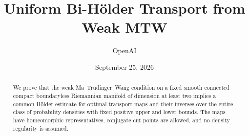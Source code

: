\documentclass[11pt]{article}
\title{Uniform Bi-H\"older Transport from Weak MTW}
\author{OpenAI}
\date{September 25, 2026}
\numberwithin{equation}{section}
\theoremstyle{definition}
\theoremstyle{remark}
\begin{document}
\maketitle
\begin{abstract}
We prove that the weak Ma--Trudinger--Wang condition on a fixed smooth
connected compact boundaryless Riemannian manifold of dimension at least
two implies a common H\"older estimate for optimal transport maps and their
inverses over the entire class of probability densities with fixed positive
upper and lower bounds. The maps have homeomorphic representatives, conjugate
cut points are allowed, and no density regularity is assumed.
\end{abstract}
\tableofcontents








\end{document}
